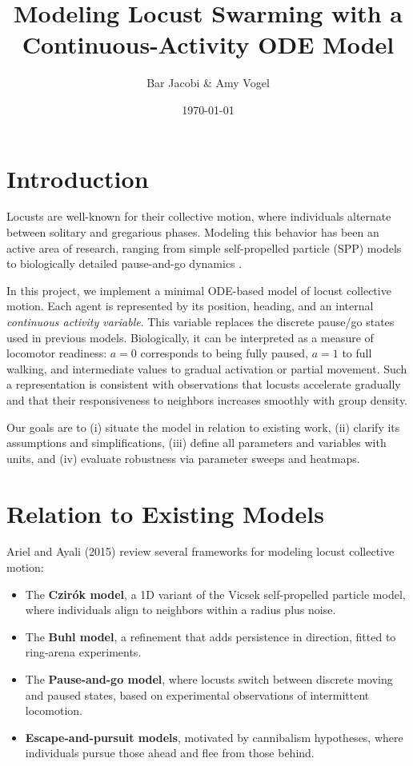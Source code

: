 \documentclass[11pt,a4paper]{article}
\title{Modeling Locust Swarming with a Continuous-Activity ODE Model}
\author{Bar Jacobi \& Amy Vogel}
\date{\today}
\begin{document}
\maketitle

\section{Introduction}

Locusts are well-known for their collective motion, where individuals alternate between solitary and gregarious phases. Modeling this behavior has been an active area of research, ranging from simple self-propelled particle (SPP) models to biologically detailed pause-and-go dynamics \cite{ariel2015locust}.  

In this project, we implement a minimal ODE-based model of locust collective motion. Each agent is represented by its position, heading, and an internal \emph{continuous activity variable}. This variable replaces the discrete pause/go states used in previous models. Biologically, it can be interpreted as a measure of locomotor readiness: $a=0$ corresponds to being fully paused, $a=1$ to full walking, and intermediate values to gradual activation or partial movement. Such a representation is consistent with observations that locusts accelerate gradually and that their responsiveness to neighbors increases smoothly with group density.  

Our goals are to (i) situate the model in relation to existing work, (ii) clarify its assumptions and simplifications, (iii) define all parameters and variables with units, and (iv) evaluate robustness via parameter sweeps and heatmaps.

\section{Relation to Existing Models}

Ariel and Ayali (2015) review several frameworks for modeling locust collective motion:
\begin{itemize}
    \item The \textbf{Czirók model}, a 1D variant of the Vicsek self-propelled particle model, where individuals align to neighbors within a radius plus noise.
    \item The \textbf{Buhl model}, a refinement that adds persistence in direction, fitted to ring-arena experiments.
    \item The \textbf{Pause-and-go model}, where locusts switch between discrete moving and paused states, based on experimental observations of intermittent locomotion.
    \item \textbf{Escape-and-pursuit models}, motivated by cannibalism hypotheses, where individuals pursue those ahead and flee from those behind.
\end{itemize}
\end{document}
